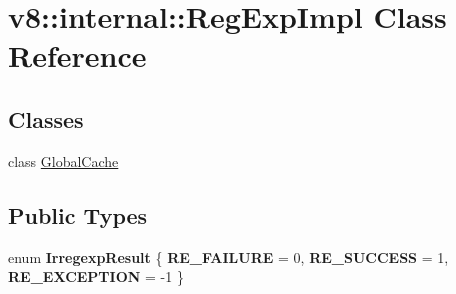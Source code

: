 \hypertarget{classv8_1_1internal_1_1_reg_exp_impl}{}\section{v8\+:\+:internal\+:\+:Reg\+Exp\+Impl Class Reference}
\label{classv8_1_1internal_1_1_reg_exp_impl}
\subsection*{Classes}
\begin{DoxyCompactItemize}
\item 
class \hyperlink{classv8_1_1internal_1_1_reg_exp_impl_1_1_global_cache}{Global\+Cache}
\end{DoxyCompactItemize}
\subsection*{Public Types}
\begin{DoxyCompactItemize}
\item 
\hypertarget{classv8_1_1internal_1_1_reg_exp_impl_a67a89cafc8ce13f1efbdc9147ce2542e}{}enum {\bfseries Irregexp\+Result} \{ {\bfseries R\+E\+\_\+\+F\+A\+I\+L\+U\+R\+E} = 0, 
{\bfseries R\+E\+\_\+\+S\+U\+C\+C\+E\+S\+S} = 1, 
{\bfseries R\+E\+\_\+\+E\+X\+C\+E\+P\+T\+I\+O\+N} = -\/1
 \}\label{classv8_1_1internal_1_1_reg_exp_impl_a67a89cafc8ce13f1efbdc9147ce2542e}

\end{DoxyCompactItemize}
